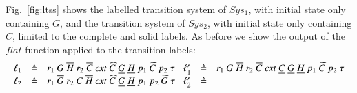 Fig.~\ref{fig:ltss} shows the labelled transition system of $Sys_1$, with initial state only  containing  $G$,  and the transition system of $Sys_2$, with initial state only containing $C$, limited to the complete
and solid labels. As before we show the output of the $flat$ function applied to the transition labels:
{\footnotesize \[
\begin{array}{lcl@{\hspace{0.3cm}} lcl}
\ell_1 &\defeq & 
r_1~G~\overline{H}~r_2~\overline{C}~\mathit{cxt}~\widehat{C}~\underline{G}~\underline{H}~p_1~\widetilde{C}~p_2~\silent
&
\ell'_1 &\defeq & 
r_1~G~\overline{H}~r_2~\overline{C}~\mathit{cxt}~\underline{C}~\underline{G}~\underline{H}~p_1~\widetilde{C}~p_2~\silent\\
\ell_2 &\defeq &
r_1~\overline{G}~r_2~C~\overline{H}~\mathit{cxt}~\widehat{C}~\underline{G}~\underline{H}~p_1~p_2~\widetilde{G}~\silent
&
\ell'_2 &\defeq & 

\end{array}\]}
